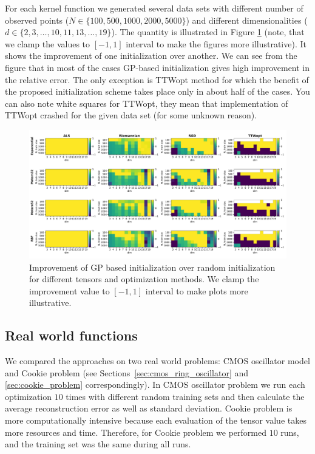 For each kernel function we generated several data sets with different number of observed points ($N \in \{100, 500, 1000, 2000, 5000\}$) and different dimensionalities ($d \in \{2, 3, \ldots, 10, 11, 13, \ldots, 19\} $).
The quantity is illustrated in Figure \ref{fig:improvement} (note, that we clamp the values to $[-1, 1]$ interval to make the figures more illustrative).
It shows the improvement of one initialization over another.
We can see from the figure that in most of the cases GP-based initialization gives high improvement in the relative error.
The only exception is TTWopt method for which the benefit of the proposed initialization scheme takes place only in about half of the cases.
You can also note white squares for TTWopt, they mean that implementation of TTWopt crashed for the given data set (for some unknown reason).


\begin{figure}
    \centering
    \includegraphics[width=\textwidth]{figures/tensor_completion/gain.pdf}
    \caption{Improvement of GP based initialization over random initialization for different tensors and optimization methods. We clamp the improvement value to $[-1, 1]$ interval to make plots more illustrative.}
    \label{fig:improvement}
\end{figure}

\subsection{Real world functions}
We compared the approaches on two real world problems:
CMOS oscillator model and Cookie problem
(see Sections~\ref{sec:cmos_ring_oscillator} and \ref{sec:cookie_problem} correspondingly).
In CMOS oscillator problem we run each optimization $10$ times with different random training sets and then calculate the average reconstruction error as well as standard deviation.
Cookie problem is more computationally intensive because each evaluation of the tensor value takes more resources and time.
Therefore, for Cookie problem we performed $10$ runs, and the training set was the same during all runs.

